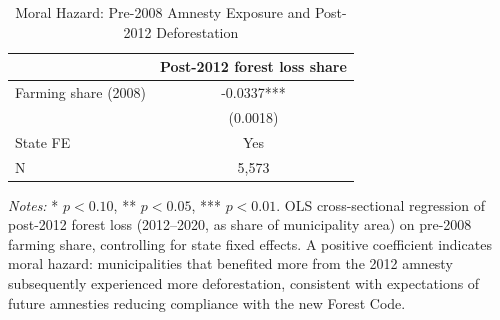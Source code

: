 \begin{table}[H]
\centering
\caption{Moral Hazard: Pre-2008 Amnesty Exposure and Post-2012 Deforestation}
\begin{threeparttable}
\begin{tabular}{lc}
\toprule
 & Post-2012 forest loss share \\
\midrule
Farming share (2008) & -0.0337*** \\
 & (0.0018) \\
\midrule
State FE & Yes \\
N & 5,573 \\
\bottomrule
\end{tabular}
\begin{tablenotes}[flushleft]
\small
\item \textit{Notes:} * $p<0.10$, ** $p<0.05$, *** $p<0.01$. OLS cross-sectional regression of post-2012 forest loss (2012--2020, as share of municipality area) on pre-2008 farming share, controlling for state fixed effects. A positive coefficient indicates moral hazard: municipalities that benefited more from the 2012 amnesty subsequently experienced more deforestation, consistent with expectations of future amnesties reducing compliance with the new Forest Code.
\end{tablenotes}
\end{threeparttable}
\label{tab:moral_hazard}
\end{table}

